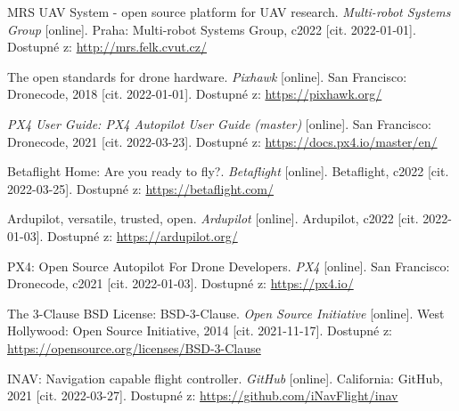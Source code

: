 

\begin{thebibliography}{99}

MRS UAV System - open source platform for UAV research. \textit{Multi-robot Systems Group} [online]. Praha: Multi-robot Systems Group, c2022 [cit. 2022-01-01]. Dostupné z: \href{http://mrs.felk.cvut.cz/}{http://mrs.felk.cvut.cz/}

The open standards for drone hardware. \textit{Pixhawk} [online]. San Francisco: Dronecode, 2018 [cit. 2022-01-01]. Dostupné z: \href{https://pixhawk.org/}{https://pixhawk.org/}

\textit{PX4 User Guide: PX4 Autopilot User Guide (master)} [online]. San Francisco: Dronecode, 2021 [cit. 2022-03-23]. Dostupné z: \href{https://docs.px4.io/master/en/}{https://docs.px4.io/master/en/}


Betaflight Home: Are you ready to fly?. \textit{Betaflight} [online]. Betaflight, c2022 [cit. 2022-03-25]. Dostupné z: \href{https://betaflight.com/}{https://betaflight.com/}


Ardupilot, versatile, trusted, open. \textit{Ardupilot} [online]. Ardupilot, c2022 [cit. 2022-01-03]. Dostupné z: \href{https://ardupilot.org/}{https://ardupilot.org/}

PX4: Open Source Autopilot For Drone Developers. \textit{PX4} [online]. San Francisco: Dronecode, c2021 [cit. 2022-01-03]. Dostupné z: \href{https://px4.io/}{https://px4.io/}

The 3-Clause BSD License: BSD-3-Clause. \textit{Open Source Initiative} [online]. West Hollywood: Open Source Initiative, 2014 [cit. 2021-11-17]. Dostupné z: \href{https://opensource.org/licenses/BSD-3-Clause}{https://opensource.org/licenses/BSD-3-Clause}

INAV: Navigation capable flight controller. \textit{GitHub} [online]. California: GitHub, 2021 [cit. 2022-03-27]. Dostupné z: \href{https://github.com/iNavFlight/inav}{https://github.com/iNavFlight/inav}



\end{thebibliography}
